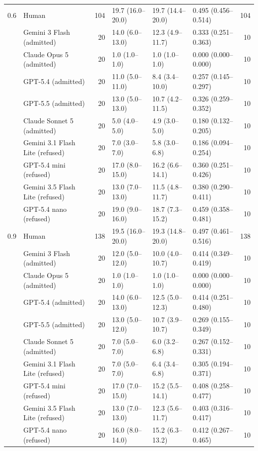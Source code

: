 \documentclass[sigconf,anonymous]{aamas}
\begin{document}
\begin{table}[t]
\begin{tabular}{@{}llrlllr@{}}
        \midrule
        0.6 & Human & 104 & 19.7 (16.0--20.0) & 19.7 (14.4--20.0) & 0.495 (0.456--0.514) & 104 \\
         & Gemini 3 Flash (admitted) & 20 & 14.0 (6.0--13.0) & 12.3 (4.9--11.7) & 0.333 (0.251--0.363) & 10 \\
         & Claude Opus 5 (admitted) & 20 & 1.0 (1.0--1.0) & 1.0 (1.0--1.0) & 0.000 (0.000--0.000) & 10 \\
         & GPT-5.4 (admitted) & 20 & 11.0 (5.0--11.0) & 8.4 (3.4--10.0) & 0.257 (0.145--0.297) & 10 \\
         & GPT-5.5 (admitted) & 20 & 13.0 (5.0--13.0) & 10.7 (4.2--11.5) & 0.326 (0.259--0.352) & 10 \\
         & Claude Sonnet 5 (admitted) & 20 & 5.0 (4.0--5.0) & 4.9 (3.0--5.0) & 0.180 (0.132--0.205) & 10 \\
         & Gemini 3.1 Flash Lite (refused) & 20 & 7.0 (3.0--7.0) & 5.8 (3.0--6.8) & 0.186 (0.094--0.254) & 10 \\
         & GPT-5.4 mini (refused) & 20 & 17.0 (8.0--15.0) & 16.2 (6.6--14.1) & 0.360 (0.251--0.426) & 10 \\
         & Gemini 3.5 Flash Lite (refused) & 20 & 13.0 (7.0--13.0) & 11.5 (4.8--11.7) & 0.380 (0.290--0.411) & 10 \\
         & GPT-5.4 nano (refused) & 20 & 19.0 (9.0--16.0) & 18.7 (7.3--15.2) & 0.459 (0.358--0.481) & 10 \\
        \midrule
        0.9 & Human & 138 & 19.5 (16.0--20.0) & 19.3 (14.8--20.0) & 0.497 (0.461--0.516) & 138 \\
         & Gemini 3 Flash (admitted) & 20 & 12.0 (5.0--12.0) & 10.0 (4.0--10.7) & 0.414 (0.349--0.419) & 10 \\
         & Claude Opus 5 (admitted) & 20 & 1.0 (1.0--1.0) & 1.0 (1.0--1.0) & 0.000 (0.000--0.000) & 10 \\
         & GPT-5.4 (admitted) & 20 & 14.0 (6.0--13.0) & 12.5 (5.0--12.3) & 0.414 (0.251--0.480) & 10 \\
         & GPT-5.5 (admitted) & 20 & 13.0 (5.0--12.0) & 10.7 (3.9--10.7) & 0.269 (0.155--0.349) & 10 \\
         & Claude Sonnet 5 (admitted) & 20 & 7.0 (5.0--7.0) & 6.0 (3.2--6.8) & 0.267 (0.152--0.331) & 10 \\
         & Gemini 3.1 Flash Lite (refused) & 20 & 7.0 (5.0--7.0) & 6.4 (3.4--6.8) & 0.305 (0.194--0.371) & 10 \\
         & GPT-5.4 mini (refused) & 20 & 17.0 (7.0--15.0) & 15.2 (5.5--14.1) & 0.408 (0.258--0.477) & 10 \\
         & Gemini 3.5 Flash Lite (refused) & 20 & 13.0 (7.0--13.0) & 12.3 (5.6--11.7) & 0.403 (0.316--0.417) & 10 \\
         & GPT-5.4 nano (refused) & 20 & 16.0 (8.0--14.0) & 15.2 (6.3--13.2) & 0.412 (0.267--0.465) & 10 \\
        \bottomrule
    \end{tabular}
\end{table}
\end{document}
